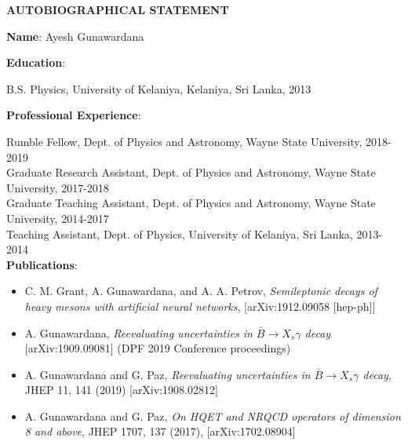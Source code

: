 

\begin{center}

\textbf{AUTOBIOGRAPHICAL STATEMENT}
\end{center}
\noindent
\textbf{Name}:
\noindent
Ayesh Gunawardana
\singlespacing

\noindent
\textbf{Education}:


\noindent
B.S. Physics, University of Kelaniya, Kelaniya, Sri Lanka, 2013

\noindent
\textbf{Professional Experience}:

\noindent
Rumble Fellow, Dept. of Physics and Astronomy, Wayne State University, 2018-2019\\
Graduate Research Assistant, Dept. of Physics and Astronomy, Wayne State University, 2017-2018\\
Graduate Teaching Assistant, Dept. of Physics and Astronomy, Wayne State University, 2014-2017\\
Teaching Assistant, Dept. of Physics, University of Kelaniya, Sri Lanka, 2013-2014\\

\noindent
\textbf{Publications}: 
\begin{itemize}
\item C. M. Grant, A. Gunawardana, and A. A. Petrov, \textit{Semileptonic decays of heavy mesons with artificial neural networks}, [arXiv:1912.09058 [hep-ph]]
\item A. Gunawardana, \textit{Reevaluating uncertainties in $\bar{B}\to X_s\gamma$ decay} [arXiv:1909.09081] (DPF 2019 Conference proceedings)
\item 	A. Gunawardana and G. Paz, \textit{Reevaluating uncertainties in $\bar{B}\to X_s\gamma$ decay}, JHEP 11, 141 (2019) [arXiv:1908.02812] 
\item	A. Gunawardana and G. Paz, \textit{On HQET and NRQCD operators of dimension 8 and above}, JHEP 1707, 137 (2017), [arXiv:1702.08904] 
\end{itemize}

\singlespacing
